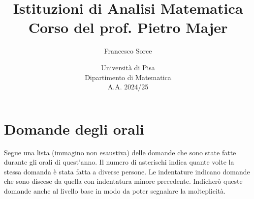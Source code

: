 \documentclass[a4paper]{report}
\title{Istituzioni di Analisi Matematica\\
\large Corso del prof. Pietro Majer}
\author{Francesco Sorce}
\date{Università di Pisa\\
Dipartimento di Matematica\\
A.A. 2024/25}
\begin{document}
\maketitle

\tableofcontents
\newpage














\appendix


\chapter{Domande degli orali}

Segue una lista (immagino non esaustiva) delle domande che sono state fatte durante gli orali di quest'anno. Il numero di asterischi indica quante volte la stessa domanda \`e stata fatta a diverse persone. Le indentature indicano domande che sono discese da quella con indentatura minore precedente. Indicherò queste domande anche al livello base in modo da poter segnalare la molteplicit\`a.
\end{document}
